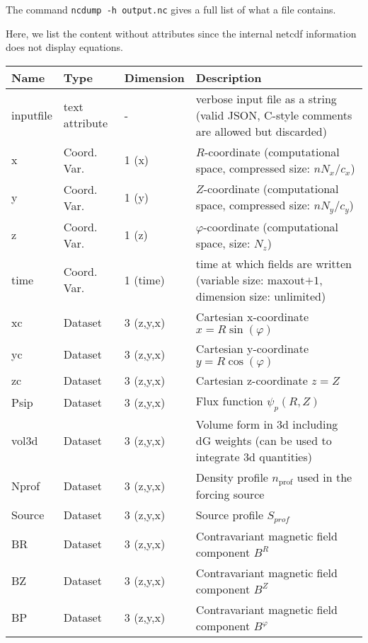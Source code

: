 \begin{tcolorbox}[title=Note]
    The command \texttt{ncdump -h output.nc} gives a full list of what a file contains.
\end{tcolorbox}
Here, we list the content without attributes
since the internal netcdf information does not display equations.
%
\begin{longtable}{lll>{\RaggedRight}p{7cm}}
\toprule
\rowcolor{gray!50}\textbf{Name} &  \textbf{Type} & \textbf{Dimension} & \textbf{Description}  \\ \midrule
inputfile  &     text attribute & - & verbose input file as a string (valid JSON, C-style comments are allowed but discarded) \\
x                & Coord. Var. & 1 (x) & $R$-coordinate (computational space, compressed size: $nN_x/c_x$)\\
y                & Coord. Var. & 1 (y) & $Z$-coordinate (computational space, compressed size: $nN_y/c_y$)\\
z                & Coord. Var. & 1 (z) & $\varphi$-coordinate (computational space, size: $N_z$) \\
time             & Coord. Var. & 1 (time)& time at which fields are written (variable size: maxout$+1$, dimension size: unlimited) \\
xc           & Dataset & 3 (z,y,x) & Cartesian x-coordinate $x=R\sin(\varphi)$ \\
yc           & Dataset & 3 (z,y,x) & Cartesian y-coordinate $y=R\cos(\varphi)$\\
zc           & Dataset & 3 (z,y,x) & Cartesian z-coordinate $z=Z$ \\
Psip             & Dataset & 3 (z,y,x) & Flux function $\psi_p(R,Z)$ \\
vol3d            & Dataset & 3 (z,y,x) & Volume form in 3d including dG weights (can be used to integrate 3d quantities)  \\
Nprof            & Dataset & 3 (z,y,x) & Density profile $n_\text{prof}$ used in the forcing source \\
Source           & Dataset & 3 (z,y,x) & Source profile $S_{prof}$\\
BR               & Dataset & 3 (z,y,x) & Contravariant magnetic field component $B^R$ \\
BZ               & Dataset & 3 (z,y,x) & Contravariant magnetic field component $B^Z$ \\
BP               & Dataset & 3 (z,y,x) & Contravariant magnetic field component $B^\varphi$ \\

\end{longtable}
